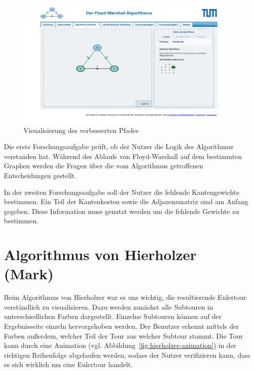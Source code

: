 \begin{figure}[h!]
	\centering
	\includegraphics[width=\textwidth]{figures/fw-matrix}
	\caption[Floyd-Warshall Matrix]{Visualisierung des verbesserten Pfades}\label{fig:fw-matrix}
\end{figure}

Die erste Forschungsaufgabe prüft, ob der Nutzer die Logik des Algorithmus verstanden hat. Während des Ablaufs von Floyd-Warshall auf dem bestimmten Graphen werden die Fragen über die vom Algorithmus getroffenen Entscheidungen gestellt.

In der zweiten Forschungsaufgabe soll der Nutzer die fehlende Kantengewichte bestimmen. Ein Teil der Kantenkosten sowie die Adjazenzmatrix sind am Anfang gegeben. Diese Information muss genutzt werden um die fehlende Gewichte zu bestimmen.

\section{Algorithmus von Hierholzer (Mark)}
Beim Algorithmus von Hierholzer war es uns wichtig, die resultierende Eulertour verständlich zu visualisieren. Dazu werden zunächst alle Subtouren in unterschiedlichen Farben dargestellt. Einzelne Subtouren können auf der Ergebnisseite einzeln hervorgehoben werden. Der Benutzer erkennt mittels der Farben außerdem, welcher Teil der Tour aus welcher Subtour stammt. Die Tour kann durch eine Animation (vgl. Abbildung~\ref{fig:hierholzer-animation}) in der richtigen Reihenfolge abgelaufen werden, sodass der Nutzer verifizieren kann, dass es sich wirklich um eine Eulertour handelt.


